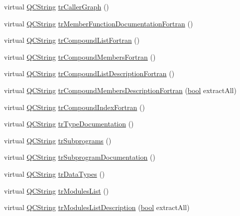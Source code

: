 \begin{DoxyCompactItemize}
\item 
virtual \hyperlink{class_q_c_string}{Q\+C\+String} \hyperlink{class_translator_dutch_abff364dcd7a756f3de5cc12a6a55d76f}{tr\+Caller\+Graph} ()
\item 
virtual \hyperlink{class_q_c_string}{Q\+C\+String} \hyperlink{class_translator_dutch_a063a80a4af626566a7207db935895d63}{tr\+Member\+Function\+Documentation\+Fortran} ()
\item 
virtual \hyperlink{class_q_c_string}{Q\+C\+String} \hyperlink{class_translator_dutch_aecca430cdc52cd155a13f4de4119e035}{tr\+Compound\+List\+Fortran} ()
\item 
virtual \hyperlink{class_q_c_string}{Q\+C\+String} \hyperlink{class_translator_dutch_ac99a6e250f2ec58407017227412e4ba7}{tr\+Compound\+Members\+Fortran} ()
\item 
virtual \hyperlink{class_q_c_string}{Q\+C\+String} \hyperlink{class_translator_dutch_a99a96af0134d09dedff1c939595d5604}{tr\+Compound\+List\+Description\+Fortran} ()
\item 
virtual \hyperlink{class_q_c_string}{Q\+C\+String} \hyperlink{class_translator_dutch_a8e16864f137ab89c0a0d47264ab6eb7e}{tr\+Compound\+Members\+Description\+Fortran} (\hyperlink{qglobal_8h_a1062901a7428fdd9c7f180f5e01ea056}{bool} extract\+All)
\item 
virtual \hyperlink{class_q_c_string}{Q\+C\+String} \hyperlink{class_translator_dutch_a7218285d03e984a2fef5c9a69645a1a4}{tr\+Compound\+Index\+Fortran} ()
\item 
virtual \hyperlink{class_q_c_string}{Q\+C\+String} \hyperlink{class_translator_dutch_a1e69c129e9cab873cabc4ac90a708f61}{tr\+Type\+Documentation} ()
\item 
virtual \hyperlink{class_q_c_string}{Q\+C\+String} \hyperlink{class_translator_dutch_a980d765ac9d746331e68a9aec6cc9c66}{tr\+Subprograms} ()
\item 
virtual \hyperlink{class_q_c_string}{Q\+C\+String} \hyperlink{class_translator_dutch_a0a6b9d26f411dece9f54f6e7677e555e}{tr\+Subprogram\+Documentation} ()
\item 
virtual \hyperlink{class_q_c_string}{Q\+C\+String} \hyperlink{class_translator_dutch_a3a8bb02a7979cc69dfd836dcb744aa59}{tr\+Data\+Types} ()
\item 
virtual \hyperlink{class_q_c_string}{Q\+C\+String} \hyperlink{class_translator_dutch_a30552149aeec73208d6a205f8e77d223}{tr\+Modules\+List} ()
\item 
virtual \hyperlink{class_q_c_string}{Q\+C\+String} \hyperlink{class_translator_dutch_abe5b90add520d21b50eeecf3f3182933}{tr\+Modules\+List\+Description} (\hyperlink{qglobal_8h_a1062901a7428fdd9c7f180f5e01ea056}{bool} extract\+All)

\end{DoxyCompactItemize}
